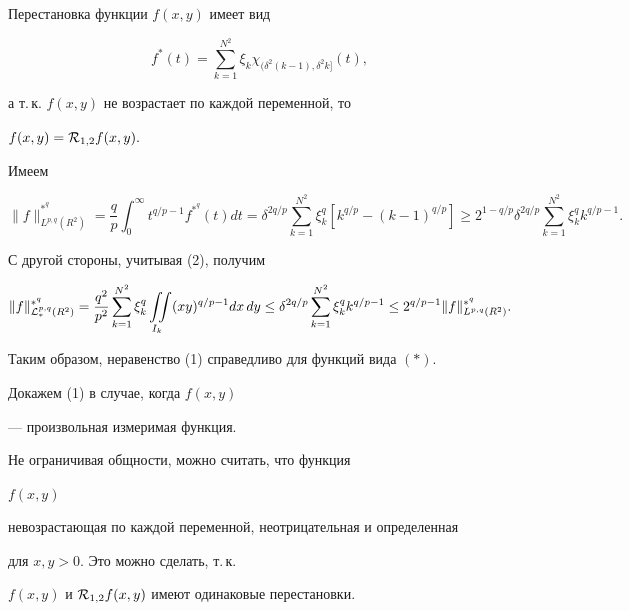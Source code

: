 Перестановка функции $f(x,y)$ имеет вид


$$


f^*(t) = \sum_{k=1}^{N^2} \xi_k


\chi_{(\delta^2(k-1),\delta^2k]}(t),


$$


а т.\,к. $f(x,y)$ не возрастает по каждой переменной, то


$f(x,y) = {\cal R}_{1,2}f(x,y).$


Имеем


$$


\|f\|_{L^{p,q}(R^2)}^{*^q} = \frac{q}{p}


\int_0^{\infty}t^{q/p-1} f^{*^q}(t)dt =


\delta^{2q/p}\sum_{k=1}^{N^2}\xi_k^q [k^{q/p}-


(k-1)^{q/p}] \ge 2^{1-q/p}\delta^{2q/p}


\sum_{k=1}^{N^2} \xi_k^q k^{q/p-1}.


$$





С другой стороны, учитывая (2), получим


$$


\|f\|_{{\cal L}_*^{p,q}(R^2)}^{*^q} =


\frac{q^2}{p^2}\sum_{k=1}^{N^2} \xi_k^q\iint\limits_{I_k}


(xy)^{q/p-1}dx\, dy \le


\delta^{2q/p}\sum_{k=1}^{N^2} \xi_k^q k^{q/p-1}


\le 2^{q/p-1}\|f\|_{L^{p,q}(R^2)}^{*^q}.


$$





Таким образом, неравенство (1) справедливо для функций вида $(*)$.





Докажем (1) в случае, когда $f(x,y)$


--- произвольная измеримая функция.


Не ограничивая общности, можно считать, что функция


$f(x,y)$


невозрастающая по каждой переменной, неотрицательная и определенная


для $x,y>0$. Это можно сделать, т.\,к.


$f(x,y)$ и ${\cal R}_{1,2}f(x,y)$ имеют одинаковые перестановки.





